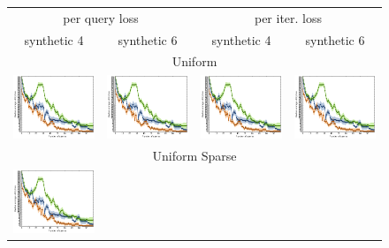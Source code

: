 \documentclass{article}
\renewcommand\[{\begin{equation}}
\renewcommand\]{\end{equation}}
\begin{document}
\begin{figure}[b]
    \centering
    {\footnotesize
    \begin{tabular}{cccc}
        \hline
        \multicolumn{2}{c}{{\sc per query loss}} &
        \multicolumn{2}{c}{{\sc per iter. loss}}
        \\
        {\sc synthetic 4} & {\sc synthetic 6} & {\sc synthetic 4} & {\sc synthetic 6}
        \\
        \hline \hline
        \multicolumn{4}{c}{{\sc Uniform}}
        \\
        \includegraphics[width=10em]{figures/loss} &
        \includegraphics[width=10em]{figures/loss} &
        \includegraphics[width=10em]{figures/loss} &
        \includegraphics[width=10em]{figures/loss}
        \\
        \hline
        \multicolumn{4}{c}{{\sc Uniform Sparse}}
        \\
        \includegraphics[width=10em]{figures/loss} &

\end{tabular}}
\end{figure}
\end{document}
